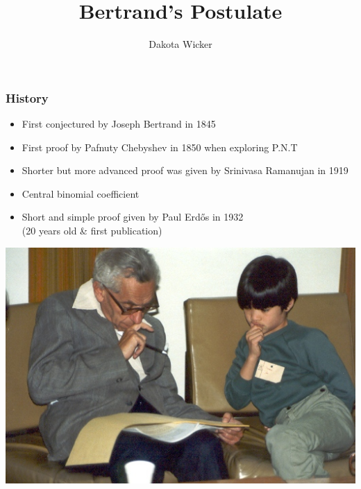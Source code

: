 \documentclass{beamer}
\title{Bertrand's Postulate}
\author{Dakota Wicker}
\begin{document}
\begin{frame}
\titlepage
\end{frame}

\begin{frame}
\frametitle{History}
\begin{itemize}[<+->]
\item First conjectured by Joseph Bertrand in 1845
\item First proof by Pafnuty Chebyshev in 1850 when exploring P.N.T
\item Shorter but more advanced proof was given by Srinivasa Ramanujan in 1919
\item Central binomial coefficient
\item Short and simple proof given by Paul Erdős in 1932 \\ (20 years old \& first publication)
\end{itemize}
\pause
\begin{center}
\includegraphics[scale=.5]{Erdos_Tao}
\end{center}
\end{frame}
\end{document}
